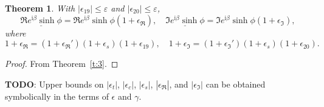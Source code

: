 \documentclass[a4paper,12pt,twoside]{article}
\newtheorem{thm}{Theorem}
\begin{document}
\begin{thm}\label{t:4}
  With $|\epsilon_{19}|\le\varepsilon$ and
  $|\epsilon_{20}|\le\varepsilon$,
  \begin{displaymath}
    \underline{\Re{e^{\mathrm{i}\beta}}\sinh\phi}=\Re{e^{\mathrm{i}\beta}}\sinh\phi(1+\epsilon_{\Re}^{}),\quad
    \underline{\Im{e^{\mathrm{i}\beta}}\sinh\phi}=\Im{e^{\mathrm{i}\beta}}\sinh\phi(1+\epsilon_{\Im}^{}),
  \end{displaymath}
  where
  \begin{equation}
    1+\epsilon_{\Re}^{}=(1+\epsilon_{\Re}')(1+\epsilon_s^{})(1+\epsilon_{19}),\quad
    1+\epsilon_{\Im}^{}=(1+\epsilon_{\Im}')(1+\epsilon_s^{})(1+\epsilon_{20}).
    \label{e:27}
  \end{equation}
\end{thm}
\begin{proof}
  From Theorem~\ref{t:3}.
\end{proof}

\textbf{TODO}: Upper bounds on $|\epsilon_t|$, $|\epsilon_c|$,
$|\epsilon_s|$, $|\epsilon_{\Re}|$, and $|\epsilon_{\Im}|$ can be
obtained symbolically in the terms of $\epsilon$ and $\gamma$.
\end{document}

